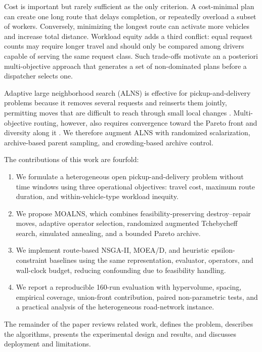 \documentclass[11pt,a4paper]{article}
\newcommand{\MOALNS}{MOALNS}
\begin{document}
Cost is important but rarely sufficient as the only criterion. A cost-minimal plan can create one long route that delays completion, or repeatedly overload a subset of workers. Conversely, minimizing the longest route can activate more vehicles and increase total distance. Workload equity adds a third conflict: equal request counts may require longer travel and should only be compared among drivers capable of serving the same request class. Such trade-offs motivate an a posteriori multi-objective approach that generates a set of non-dominated plans before a dispatcher selects one.

Adaptive large neighborhood search (ALNS) is effective for pickup-and-delivery problems because it removes several requests and reinserts them jointly, permitting moves that are difficult to reach through small local changes \cite{ropke2006alns}. Multi-objective routing, however, also requires convergence toward the Pareto front and diversity along it \cite{jozefowiez2008multi}. We therefore augment ALNS with randomized scalarization, archive-based parent sampling, and crowding-based archive control.

The contributions of this work are fourfold:
\begin{enumerate}[leftmargin=*,itemsep=2pt]
    \item We formulate a heterogeneous open pickup-and-delivery problem without time windows using three operational objectives: travel cost, maximum route duration, and within-vehicle-type workload inequity.
    \item We propose \MOALNS{}, which combines feasibility-preserving destroy--repair moves, adaptive operator selection, randomized augmented Tchebycheff search, simulated annealing, and a bounded Pareto archive.
    \item We implement route-based NSGA-II, MOEA/D, and heuristic epsilon-constraint baselines using the same representation, evaluator, operators, and wall-clock budget, reducing confounding due to feasibility handling.
    \item We report a reproducible 160-run evaluation with hypervolume, spacing, empirical coverage, union-front contribution, paired non-parametric tests, and a practical analysis of the heterogeneous road-network instance.
\end{enumerate}

The remainder of the paper reviews related work, defines the problem, describes the algorithms, presents the experimental design and results, and discusses deployment and limitations.
\end{document}
